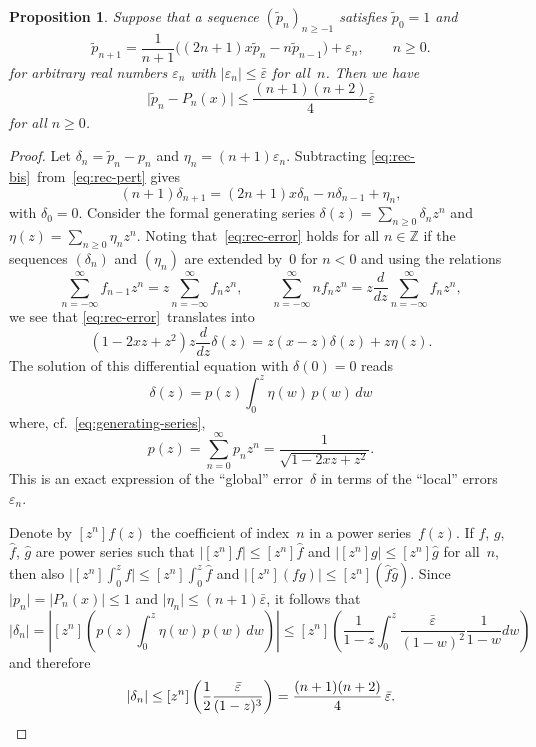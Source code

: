 \documentclass[11pt,a4paper]{article}
\newtheorem{proposition}[theorem]{Proposition}
\newcommand{\abs}[1]{\mathopen| #1 \mathclose|}
\newcommand{\ddz}{\frac{d}{dz}}
\begin{document}
\begin{proposition} \label{prop:rec-error}
Suppose that a sequence $(\tilde p_n)_{n \geq -1}$ satisfies
$\tilde p_0 = 1$ and
\begin{equation} \label{eq:rec-pert}
  \tilde{p}_{n + 1} =
    \frac{1}{n+1}
    \bigl( (2n +1) x \tilde{p}_n - n \tilde{p}_{n-1} \bigr)
    + \varepsilon_n,
  \qquad n \geq 0.
\end{equation}
for arbitrary real numbers $\varepsilon_n$
with $\abs{\varepsilon_n} \leq \bar\varepsilon$ for all $n$.
Then we have
\[
  \abs{\tilde p_n  - P_n(x)}
  \leq \frac{(n+1)(n+2)}{4} \bar \varepsilon
\]
for all $n \geq 0$.
\end{proposition}

\begin{proof}
Let
$\delta_n = \tilde{p}_n - p_n$
and
$\eta_n = (n + 1) \varepsilon_n$.
Subtracting \eqref{eq:rec-bis} from \eqref{eq:rec-pert} gives
\begin{equation} \label{eq:rec-error}
  (n + 1) \delta_{n + 1}
  = (2 n + 1) x \delta_n - n \delta_{n - 1} + \eta_n,
\end{equation}
with $\delta_0 = 0$.
Consider the formal generating series
$\delta(z) = \sum_{n \geq 0} \delta_n z^n$
and
$\eta(z) = \sum_{n \geq 0} \eta_n z^n$.
Noting that \eqref{eq:rec-error} holds for all $n \in \mathbb{Z}$ if
the sequences $(\delta_n)$ and $(\eta_n)$ are extended by~$0$ for
$n < 0$
and using the relations
\[
  \sum_{n=-\infty}^{\infty} f_{n - 1} z^n
  = z \sum_{n=-\infty}^{\infty} f_n z^n,
  \qquad
  \sum_{n=-\infty}^{\infty} n f_{n} z^n
  = z \ddz \sum_{n=-\infty}^{\infty} f_n z^n,
\]
we see that \eqref{eq:rec-error} translates into
\[ (1 - 2 xz + z^2) z \ddz \delta (z)
   = z (x - z) \delta (z) + z \eta (z). \]
The solution of this differential equation with $\delta (0) = 0$ reads
\[ \delta(z) = p(z)  \int_0^z \eta(w) \, p(w) \, dw \]
where, cf. \eqref{eq:generating-series},
\[ p(z) = \sum_{n=0}^{\infty} p_n z^n
        = \frac{1}{\sqrt{1 - 2 xz + z^2}}. \]
This is an exact expression of the ``global'' error $\delta$ in terms
of the ``local'' errors~$\varepsilon_n$.

Denote by $[z^n] f(z)$ the coefficient of index $n$ in a power
series $f(z)$.
If $f$, $g$, $\hat f$, $\hat g$ are power series such that
$\abs{[z^n] f} \leq [z^n] \hat f$ and
$\abs{[z^n] g} \leq [z^n] \hat g$
for all $n$, then also
$\abs{[z^n] \int_0^z f} \leq [z^n] \int_0^z \hat f$ and
$\abs{[z^n] (fg)} \leq [z^n] (\hat f \hat g)$.
Since $\abs{p_n} = \abs{P_n(x)} \leq 1$
and $\abs{\eta_n} \leq (n+1) \bar \varepsilon$,
it follows that
\[
  \abs{\delta_n}
  = \left| [z^n] \left( p(z)  \int_0^z \eta(w) \, p(w) \, dw \right) \right|
  \leq [z^n] \left(
    \frac{1}{1-z}
    \int_0^z \frac{\bar \varepsilon}{(1 - w)^2} \frac{1}{1-w} dw \right)
\]
and therefore
\[
  \abs{\delta_n}
  \leq [z^n] \left( \frac12 \frac{\bar \varepsilon}{(1-z)^3} \right)
  = \frac{(n+1)(n+2)}{4} \, \bar \varepsilon. \qedhere
\]
\end{proof}
\end{document}
